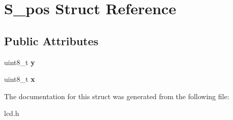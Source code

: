 \hypertarget{structS__pos}{\section{\-S\-\_\-pos \-Struct \-Reference}
\label{structS__pos}
}
\subsection*{\-Public \-Attributes}
\begin{DoxyCompactItemize}
\item 
\hypertarget{structS__pos_ab49282bc7fd84ac160dbc74a876e6666}{uint8\-\_\-t {\bfseries y}}\label{structS__pos_ab49282bc7fd84ac160dbc74a876e6666}

\item 
\hypertarget{structS__pos_a9100764894b1e4291c0b4ca565e40cf8}{uint8\-\_\-t {\bfseries x}}\label{structS__pos_a9100764894b1e4291c0b4ca565e40cf8}

\end{DoxyCompactItemize}


\-The documentation for this struct was generated from the following file\-:\begin{DoxyCompactItemize}
\item 
lcd.\-h\end{DoxyCompactItemize}
